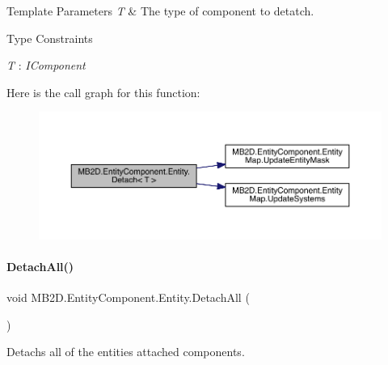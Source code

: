 \begin{DoxyTemplParams}{Template Parameters}
{\em T} & The type of component to detatch.\\
\hline
\end{DoxyTemplParams}
\begin{Desc}
\item[Type Constraints]\begin{description}
\item[{\em T} : {\em I\+Component}]\end{description}
\end{Desc}
Here is the call graph for this function\+:
\nopagebreak
\begin{figure}[H]
\begin{center}
\leavevmode
\includegraphics[width=350pt]{class_m_b2_d_1_1_entity_component_1_1_entity_a9194f3b1f3370d2ecb47efe077ba4050_cgraph}
\end{center}
\end{figure}
\hypertarget{class_m_b2_d_1_1_entity_component_1_1_entity_a5c006a368383ba7b17653d9f958ceaf8}{}\label{class_m_b2_d_1_1_entity_component_1_1_entity_a5c006a368383ba7b17653d9f958ceaf8} 
\paragraph{\texorpdfstring{Detach\+All()}{DetachAll()}}
{\footnotesize\ttfamily void M\+B2\+D.\+Entity\+Component.\+Entity.\+Detach\+All (\begin{DoxyParamCaption}{ }\end{DoxyParamCaption})\hspace{0.3cm}{\ttfamily [inline]}}



Detachs all of the entities attached components. 

